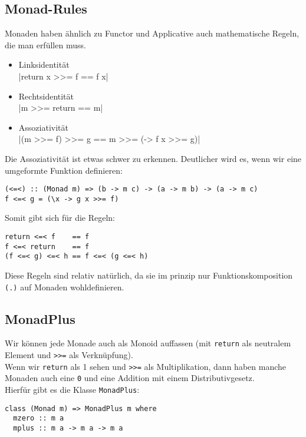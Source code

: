 \documentclass{beamer}
\begin{document}
\subsection{Monad-Rules}
\begin{frame}[fragile]
Monaden haben ähnlich zu Functor und Applicative auch mathematische Regeln, die man erfüllen muss.\\
\begin{itemize}
 \item Linksidentität\\
       |return x >>= f == f x|
 \item Rechtsidentität\\
       |m >>= return == m|
 \item Assoziativität\\
       |(m >>= f) >>= g == m >>= (\x -> f x >>= g)|
\end{itemize}
\pause
Die Assoziativität ist etwas schwer zu erkennen. Deutlicher wird es, wenn wir eine umgeformte Funktion definieren:
\begin{verbatim}
(<=<) :: (Monad m) => (b -> m c) -> (a -> m b) -> (a -> m c)
f <=< g = (\x -> g x >>= f)
\end{verbatim}
\end{frame}

\begin{frame}[fragile]
Somit gibt sich für die Regeln:
\begin{verbatim}
return <=< f    == f
f <=< return    == f
(f <=< g) <=< h == f <=< (g <=< h)
\end{verbatim}
\pause
Diese Regeln sind relativ \glqq natürlich\grqq , da sie im prinzip nur Funktionskomposition \texttt{(.)} auf Monaden wohldefinieren.
\end{frame}

\subsection{MonadPlus}
\begin{frame}[fragile]
Wir können jede Monade auch als Monoid auffassen (mit \texttt{return} als neutralem Element und \texttt{>>=} als Verknüpfung).\\
\pause
Wenn wir \texttt{return} als 1 sehen und \texttt{>>=} als Multiplikation, dann haben manche Monaden auch eine \texttt{0} und eine Addition mit einem Distributivgesetz.\\
Hierfür gibt es die Klasse \texttt{MonadPlus}:
\begin{verbatim}
class (Monad m) => MonadPlus m where
  mzero :: m a
  mplus :: m a -> m a -> m a
\end{verbatim}
\end{frame}
\end{document}
